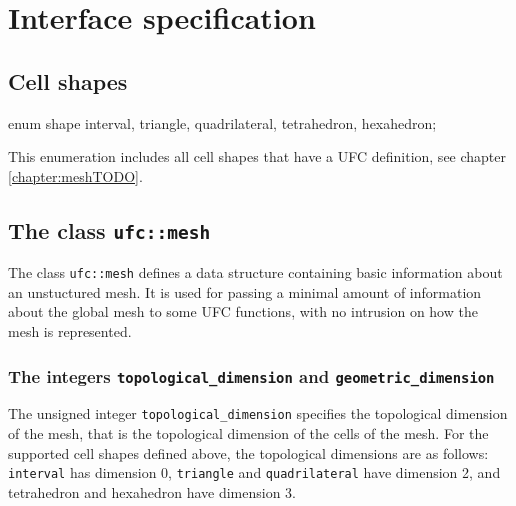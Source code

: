 \chapter{Interface specification}
\label{sec:interface}



\section{Cell shapes}


\begin{code}
enum shape {interval,
            triangle, quadrilateral,
            tetrahedron, hexahedron};
\end{code}

This enumeration includes all cell shapes that have a UFC definition, see chapter \ref{chapter:meshTODO}.


\section{The class \texttt{ufc::mesh}}

The class \texttt{ufc::mesh} defines a data structure containing basic information about
an unstuctured mesh. It is used for passing a minimal amount of information about the
global mesh to some UFC functions, with no intrusion on how the mesh is represented.

\subsection{The integers \texttt{topological\_dimension} and \texttt{geometric\_dimension}}


The unsigned integer \texttt{topological\_dimension}
specifies the topological dimension of the mesh, that is the
topological dimension of the cells of the mesh. For the supported
cell shapes defined above, the topological dimensions are as follows:
\texttt{interval} has dimension 0, \texttt{triangle} and
\texttt{quadrilateral} have dimension 2, and tetrahedron and
hexahedron have dimension 3.

